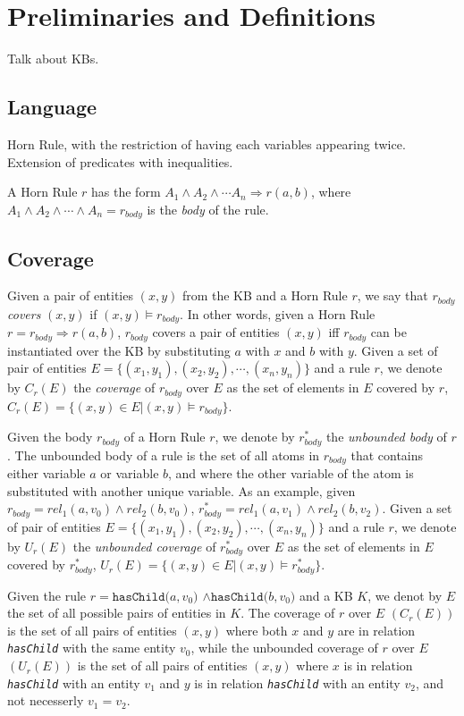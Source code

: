 \section{Preliminaries and Definitions}
{\color{red} Talk about KBs.}

\subsection{Language}
{\color{red} Horn Rule, with the restriction of having each variables appearing twice.
Extension of predicates with inequalities.}

A Horn Rule $r$ has the form $A_1 \wedge A_2 \wedge \cdots A_n \Rightarrow r(a,b)$, where  $A_1 \wedge A_2 \wedge \cdots \wedge A_n = r_{body}$ is the \emph{body} of the rule.

\subsection{Coverage}
Given a pair of entities $(x,y)$ from the KB and a Horn Rule $r$, we say that $r_{body}$ \emph{covers} $(x,y)$ if
$(x,y) \models r_{body}$. In other words, given a Horn Rule $r = r_{body} \Rightarrow r(a,b)$, $r_{body}$ covers a pair of entities $(x,y)$ iff $r_{body}$ can be instantiated over the KB by substituting $a$ with $x$ and $b$ with $y$. Given a set of pair of entities $E = \{(x_1,y_1),(x_2,y_2),\cdots,(x_n,y_n)\}$ and a rule $r$, we denote by $C_r(E)$ the \emph{coverage} of $r_{body}$ over $E$ as the set of elements in $E$ covered by $r$, $C_r(E)=\{(x,y) \in E | (x,y) \models r_{body}\}$.

Given the body $r_{body}$ of a Horn Rule $r$, we denote by $r^{*}_{body}$ the \emph{unbounded body} of $r$. The unbounded body of a rule is the set of all atoms in $r_{body}$ that contains either variable $a$ or variable $b$, and where the other variable of the atom is substituted with another unique variable. As an example, given $r_{body} = rel_1(a,v_0) \wedge rel_2(b,v_0)$, $r^{*}_{body} = rel_1(a,v_1) \wedge rel_2(b,v_2)$. Given a set of pair of entities $E = \{(x_1,y_1),(x_2,y_2),\cdots,(x_n,y_n)\}$ and a rule $r$, we denote by $U_r(E)$ the \emph{unbounded coverage} of $r^{*}_{body}$ over $E$ as the set of elements in $E$ covered by $r^{*}_{body}$, $U_r(E)=\{(x,y) \in E | (x,y) \models r^{*}_{body}\}$.

\begin{myExample}
	Given the rule \emph{$r=\texttt{hasChild(}a,v_0\texttt{)} $ $\wedge \texttt{hasChild(}b,v_0\texttt{)}$} and a KB $K$, we denot by $E$ the set of all possible pairs of entities in $K$.
	 The coverage of $r$ over $E$ $(C_r(E))$ is the set of all pairs of entities $(x,y)$ where both $x$ and $y$ are in relation \emph{\texttt{hasChild}} with the same entity $v_0$, while the unbounded coverage of $r$ over $E$ $(U_r(E))$ is the set of all pairs of entities $(x,y)$ where $x$ is in relation \emph{\texttt{hasChild}} with an entity $v_1$ and $y$ is in relation \emph{\texttt{hasChild}} with an entity $v_2$, and not necesserly $v_1 = v_2$. 
\end{myExample}

